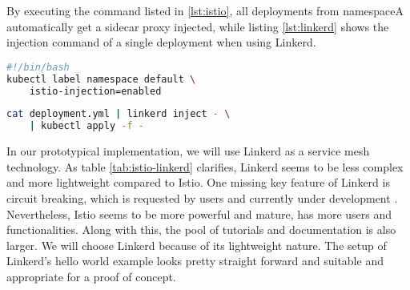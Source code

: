 By executing the command listed in \ref{lst:istio}, all deployments from namespaceA automatically get a sidecar proxy injected, while listing \ref{lst:linkerd} shows the injection command of a single deployment when using Linkerd.

\begin{lstlisting}[language=bash,caption={Injection of sidecards into deployments of a namespace in Istio},label={lst:istio}]
#!/bin/bash
kubectl label namespace default \
	istio-injection=enabled
\end{lstlisting}

\begin{lstlisting}[language=bash,caption={Injection of sidecards into a deployment in Linkerd}, label={lst:linkerd}]
cat deployment.yml | linkerd inject - \
	| kubectl apply -f -
\end{lstlisting}

%
% 

In our prototypical implementation, we will use Linkerd as a service mesh technology. As table \ref{tab:istio-linkerd} clarifies, Linkerd seems to be less complex and more lightweight compared to Istio. One missing key feature of Linkerd is circuit breaking, which is requested by users and currently under development \cite{linkerd-circuit-breaker}. Nevertheless, Istio seems to be more powerful and mature, has more users and functionalities. Along with this, the pool of tutorials and documentation is also larger.
We will choose Linkerd because of its lightweight nature. The setup of Linkerd's hello world example looks pretty straight forward and suitable and appropriate for a proof of concept.